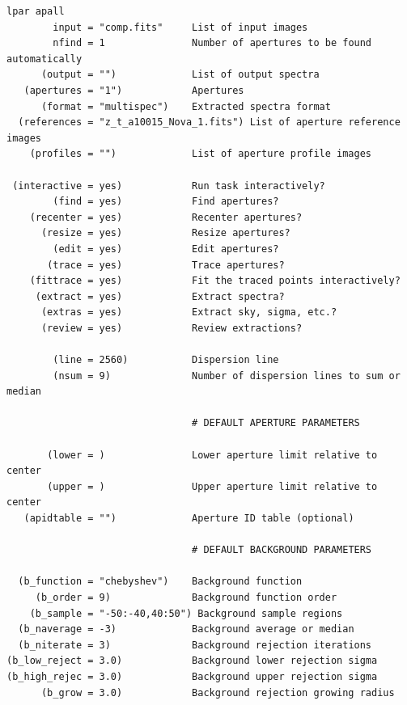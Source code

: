 \documentclass[letter,11pt,oneside]{article}
\begin{document}
\begingroup \fontsize{10pt}{10pt}
\selectfont
\begin{verbatim} 
lpar apall
        input = "comp.fits"     List of input images
        nfind = 1               Number of apertures to be found automatically
      (output = "")             List of output spectra
   (apertures = "1")            Apertures
      (format = "multispec")    Extracted spectra format
  (references = "z_t_a10015_Nova_1.fits") List of aperture reference images
    (profiles = "")             List of aperture profile images
                                
 (interactive = yes)            Run task interactively?
        (find = yes)            Find apertures?
    (recenter = yes)            Recenter apertures?
      (resize = yes)            Resize apertures?
        (edit = yes)            Edit apertures?
       (trace = yes)            Trace apertures?
    (fittrace = yes)            Fit the traced points interactively?
     (extract = yes)            Extract spectra?
      (extras = yes)            Extract sky, sigma, etc.?
      (review = yes)            Review extractions?
                                
        (line = 2560)           Dispersion line
        (nsum = 9)              Number of dispersion lines to sum or median
                                
                                # DEFAULT APERTURE PARAMETERS
                                
       (lower = )               Lower aperture limit relative to center
       (upper = )               Upper aperture limit relative to center
   (apidtable = "")             Aperture ID table (optional)
                                
                                # DEFAULT BACKGROUND PARAMETERS
                                
  (b_function = "chebyshev")    Background function
     (b_order = 9)              Background function order
    (b_sample = "-50:-40,40:50") Background sample regions
  (b_naverage = -3)             Background average or median
  (b_niterate = 3)              Background rejection iterations
(b_low_reject = 3.0)            Background lower rejection sigma
(b_high_rejec = 3.0)            Background upper rejection sigma
      (b_grow = 3.0)            Background rejection growing radius
                                

\end{verbatim}
\end{document}
